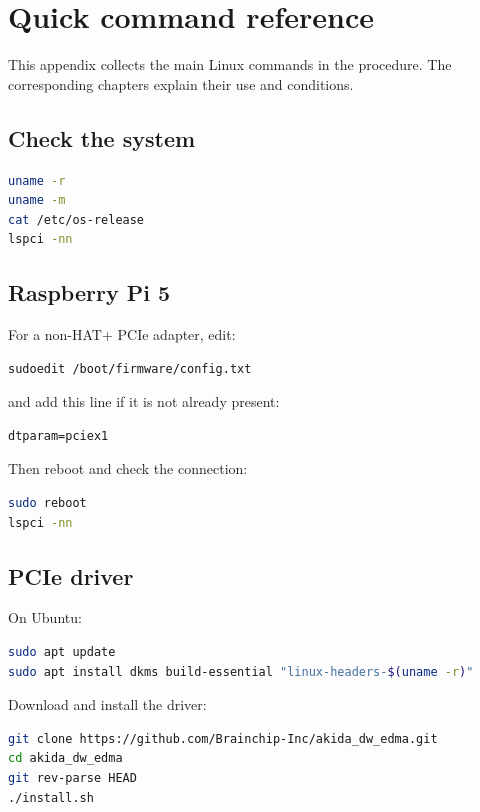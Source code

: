 \chapter{Quick command reference}
\label{app:comandos}
\lstset{aboveskip=0.35em,belowskip=0.4em}

This appendix collects the main Linux commands in the procedure. The corresponding
chapters explain their use and conditions.

\section{Check the system}

\begin{lstlisting}[language=bash]
uname -r
uname -m
cat /etc/os-release
lspci -nn
\end{lstlisting}

\section{Raspberry Pi 5}

For a non-HAT+ PCIe adapter, edit:

\begin{lstlisting}[language=bash]
sudoedit /boot/firmware/config.txt
\end{lstlisting}

and add this line if it is not already present:

\begin{lstlisting}
dtparam=pciex1
\end{lstlisting}

Then reboot and check the connection:

\begin{lstlisting}[language=bash]
sudo reboot
lspci -nn
\end{lstlisting}

\section{PCIe driver}

On Ubuntu:

\begin{lstlisting}[language=bash]
sudo apt update
sudo apt install dkms build-essential "linux-headers-$(uname -r)"
\end{lstlisting}

Download and install the driver:

\begin{lstlisting}[language=bash]
git clone https://github.com/Brainchip-Inc/akida_dw_edma.git
cd akida_dw_edma
git rev-parse HEAD
./install.sh
\end{lstlisting}

